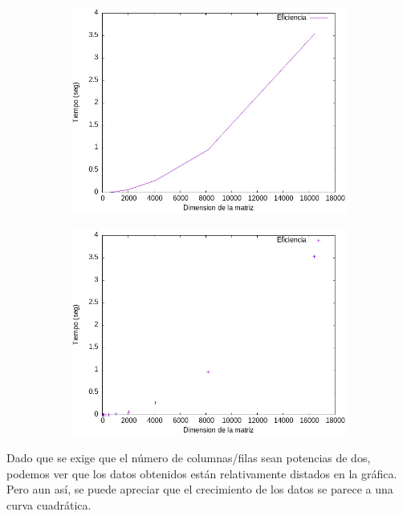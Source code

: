 \documentclass{article}
\begin{document}
\begin{figure}[H]
    \begin{subfigure}{0.4\textwidth}
        \centering
        \includegraphics[scale = 0.40]{P2/L_Shape_DyV_lines.jpeg}
    \end{subfigure} \hfill
    \begin{subfigure}{0.4\textwidth}
        \centering
        \includegraphics[scale = 0.40]{P2/L_Shape_DyV_puntos.jpeg}
    \end{subfigure}
\end{figure}


    Dado que se exige que el número de columnas/filas sean
    potencias de dos, podemos ver que los datos obtenidos están
    relativamente distados en la gráfica. Pero aun así, se puede apreciar que el crecimiento de los datos se parece a una curva cuadrática. 
\end{document}
